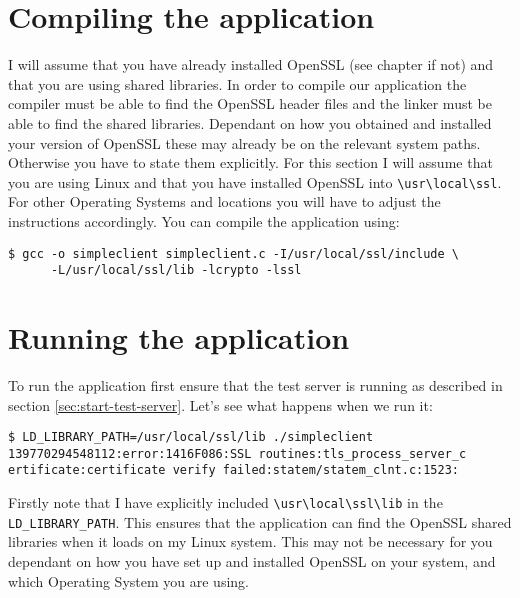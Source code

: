 \section {Compiling the application}

I will assume that you have already installed OpenSSL (see chapter  if not) and that you are using shared libraries. In order to compile our 
application the compiler must be able to find the OpenSSL header files and the 
linker must be able to find the shared libraries. Dependant on how you obtained 
and installed your version of OpenSSL these may already be on the relevant 
system paths. Otherwise you have to state them explicitly. For this section I 
will assume that you are using Linux and that you have installed OpenSSL into
\verb!\usr\local\ssl!. For other Operating Systems and locations you will have 
to adjust the instructions accordingly. You can compile the application using:

\begin{verbatim}
$ gcc -o simpleclient simpleclient.c -I/usr/local/ssl/include \
      -L/usr/local/ssl/lib -lcrypto -lssl
\end{verbatim}

\section {Running the application}

To run the application first ensure that the test server is running as 
described in section \ref{sec:start-test-server}. Let's see what happens when 
we run it:

\begin{verbatim}
$ LD_LIBRARY_PATH=/usr/local/ssl/lib ./simpleclient
139770294548112:error:1416F086:SSL routines:tls_process_server_c
ertificate:certificate verify failed:statem/statem_clnt.c:1523:
\end{verbatim}

Firstly note that I have explicitly included \verb!\usr\local\ssl\lib! in the 
\verb!LD_LIBRARY_PATH!. This ensures that the application can find the OpenSSL 
shared libraries when it loads on my Linux system. This may not be necessary for
you dependant on how you have set up and installed OpenSSL on your system, and 
which Operating System you are using.

